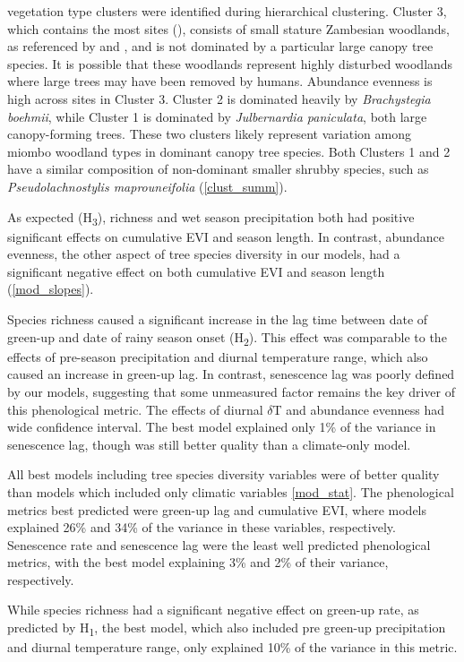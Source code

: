 \documentclass[11pt,a4paper]{article}
\begin{document}
\nCluster{} vegetation type clusters were identified during hierarchical clustering. Cluster 3, which contains the most sites (\nClusterC{}), consists of small stature Zambesian woodlands, as referenced by \citet{Dinerstein2017} and \citet{Chidumayo2001}, and is not dominated by a particular large canopy tree species. It is possible that these woodlands represent highly disturbed woodlands where large trees may have been removed by humans. Abundance evenness is high across sites in Cluster 3. Cluster 2 is dominated heavily by \textit{Brachystegia boehmii}, while Cluster 1 is dominated by \textit{Julbernardia paniculata}, both large canopy-forming trees. These two clusters likely represent variation among miombo woodland types in dominant canopy tree species. Both Clusters 1 and 2 have a similar composition of non-dominant smaller shrubby species, such as \textit{Pseudolachnostylis maprouneifolia} (\autoref{clust_summ}).

As expected (H\textsubscript{3}), richness and wet season precipitation both had positive significant effects on cumulative EVI and season length. In contrast, abundance evenness, the other aspect of tree species diversity in our models, had a significant negative effect on both cumulative EVI and season length (\autoref{mod_slopes}).

Species richness caused a significant increase in the lag time between date of green-up and date of rainy season onset (H\textsubscript{2}). This effect was comparable to the effects of pre-season precipitation and diurnal temperature range, which also caused an increase in green-up lag. In contrast, senescence lag was poorly defined by our models, suggesting that some unmeasured factor remains the key driver of this phenological metric. The effects of diurnal $\delta$T and abundance evenness had wide confidence interval. The best model explained only 1\% of the variance in senescence lag, though was still better quality than a climate-only model.

All best models including tree species diversity variables were of better quality than models which included only climatic variables \autoref{mod_stat}. The phenological metrics best predicted were green-up lag and cumulative EVI, where models explained 26\% and 34\% of the variance in these variables, respectively. Senescence rate and senescence lag were the least well predicted phenological metrics, with the best model explaining 3\% and 2\% of their variance, respectively.

While species richness had a significant negative effect on green-up rate, as predicted by H\textsubscript{1}, the best model, which also included pre green-up precipitation and diurnal temperature range, only explained 10\% of the variance in this metric. 
\end{document}
